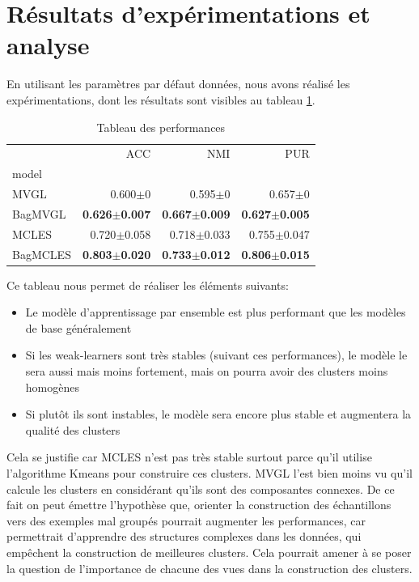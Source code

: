 \documentclass[12pt,a4paper]{report}
\begin{document}
	\section{Résultats d'expérimentations et analyse}
	En utilisant les paramètres par défaut données, nous avons réalisé les expérimentations, dont les résultats sont visibles au tableau \ref{table:perfs}.
    
	\begin{table}[h!]
    	\caption{Tableau des performances}
    	\centering
        	\begin{tabular}{lrrr}
        	\toprule
         	& ACC & NMI & PUR \\
        	model &  &  &  \\
        	\midrule
        	MVGL & 0.600$\pm$0 & 0.595$\pm$0 & 0.657$\pm$0 \\
        	BagMVGL & \textbf{0.626$\pm$0.007} & \textbf{0.667$\pm$0.009} & \textbf{0.627$\pm$0.005} \\
        	MCLES & 0.720$\pm$0.058 & 0.718$\pm$0.033 & 0.755$\pm$0.047 \\
        	BagMCLES & \textbf{0.803$\pm$0.020}& \textbf{0.733$\pm$0.012} & \textbf{0.806$\pm$0.015} \\
        	\bottomrule
        	\end{tabular}
    	\label{table:perfs}
	\end{table}
    
	Ce tableau nous permet de réaliser les éléments suivants:
	\begin{itemize}
    	\item Le modèle d'apprentissage par ensemble est plus performant que les modèles de base généralement
    	\item Si les weak-learners sont très stables (suivant ces performances), le modèle le sera aussi mais moins fortement, mais on pourra avoir des clusters moins homogènes
    	\item Si plutôt ils sont instables, le modèle sera encore plus stable et augmentera la qualité des clusters
	\end{itemize}
    
	Cela se justifie car MCLES n'est pas très stable surtout parce qu'il utilise l'algorithme Kmeans pour construire ces clusters. MVGL l'est bien moins vu qu'il calcule les clusters en considérant qu'ils sont des composantes connexes.
	De ce fait on peut émettre l'hypothèse que, orienter la construction des échantillons vers des exemples mal groupés pourrait augmenter les performances, car permettrait d'apprendre des structures complexes dans les données, qui empêchent la construction de meilleures clusters. Cela pourrait amener à se poser la question de l'importance de chacune des vues dans la construction des clusters.
    
\end{document}
